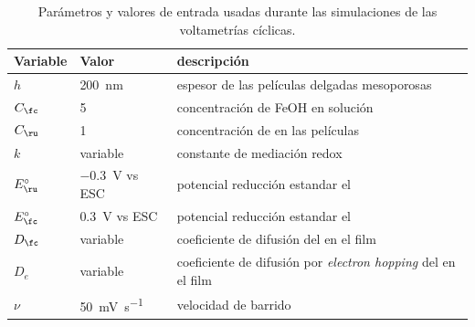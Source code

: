 			  	
	    	\begin{table}[ht!]
	 	    \caption[Parámetros de las simulaciones]{Parámetros y valores de entrada usadas durante las simulaciones de las voltametrías cíclicas.}
	 	    \begin{tabular}{>{\raggedright\arraybackslash}m{1.4cm}>{\centering\arraybackslash}m{2.8cm}>{\raggedright\arraybackslash}m{6.7cm}} 
	 	    \toprule
	 	    Variable  & 	Valor  &   descripción      \\ \midrule
	 	    $h$  	  &    \SI{200}{nm}	& 	   espesor\index{espesor} de las películas delgadas mesoporosas 	    \\ \midrule
	 	    $C_{\fc}$  & \SI{5}{\milli\Molar}  & concentración de FeOH en solución    \\ \midrule
	 	    $C_{\ru}$ & \SI{1}{\milli\Molar}  & concentración de \ru\space en las películas    \\ \midrule
	 	    $k$ 		   & variable 	 & 	constante de mediación\index{mediacion} redox    \\ \midrule
	 	    $E^\circ_{\ru}$  & \SI{-0.3}{\volt} vs ESC & potencial reducción estandar el \ru \\ \midrule
	 	    $E^\circ_{\fc}$  & \SI{0.3}{\volt} vs ESC & potencial reducción estandar el \fc \\ \midrule
	 	    $D_{\fc}$  & variable & coeficiente de difusión\index{difusión} del \fc\space en el film \\ \midrule
	 	    $D_{e}$  & variable & coeficiente de difusión\index{difusión} por \textit{electron hopping }del \ru\space en el film \\ \midrule
	 	    $\nu$    & \SI{50}{\milli\volt\per\second}  &  velocidad de barrido\index{velocidad!de barrido} \\
	 	     \bottomrule
			\end{tabular}
			\label{tabla:simulacion}
			\end{table} 




